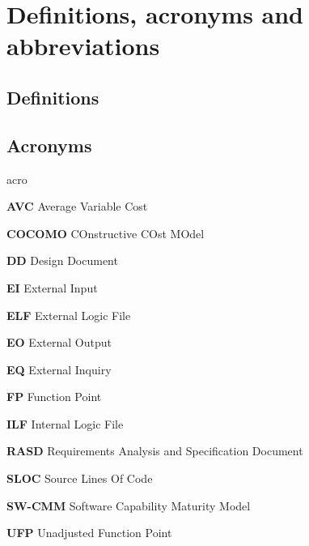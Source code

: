 \section{Definitions, acronyms and abbreviations}

\subsection{Definitions}

\subsection{Acronyms}
	\begin{labeling}{acro}
		\item[\textbf{AVC}] Average Variable Cost
		\item[\textbf{COCOMO}] COnstructive COst MOdel
		\item[\textbf{DD}] Design Document
		\item[\textbf{EI}] External Input
		\item[\textbf{ELF}] External Logic File
		\item[\textbf{EO}] External Output
		\item[\textbf{EQ}] External Inquiry
		\item[\textbf{FP}] Function Point
		\item[\textbf{ILF}] Internal Logic File
		\item[\textbf{RASD}] Requirements Analysis and Specification Document
		\item[\textbf{SLOC}] Source Lines Of Code
		\item[\textbf{SW-CMM}] Software Capability Maturity Model
		\item[\textbf{UFP}] Unadjusted Function Point
	\end{labeling}


